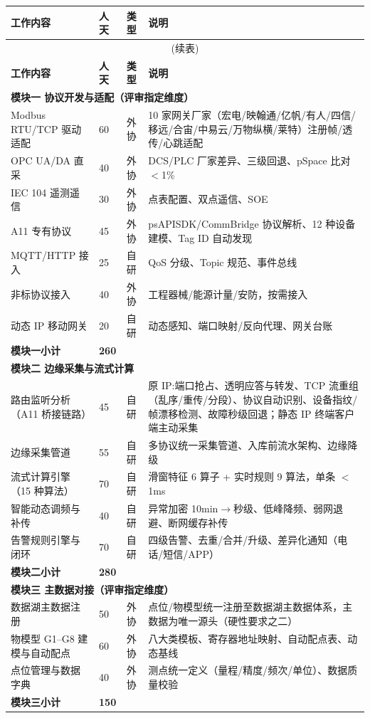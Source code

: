 \documentclass[11pt,a4paper]{ctexart}
\begin{document}
\begin{longtable}{p{4.6cm} p{1.8cm} p{1.5cm} p{4.2cm}}
\toprule
\textbf{工作内容} & \textbf{人天} & \textbf{类型} & \textbf{说明} \\
\midrule
\endfirsthead
\multicolumn{4}{c}{(续表)} \\
\toprule
\textbf{工作内容} & \textbf{人天} & \textbf{类型} & \textbf{说明} \\
\midrule
\endhead

\multicolumn{4}{l}{\textbf{模块一 协议开发与适配（评审指定维度）}} \\
Modbus RTU/TCP 驱动适配 & 60 & 外协 & 10 家网关厂家（宏电/映翰通/亿帆/有人/四信/移远/合宙/中易云/万物纵横/莱特）注册帧/透传/心跳适配 \\
OPC UA/DA 直采 & 40 & 外协 & DCS/PLC 厂家差异、三级回退、pSpace 比对 $<$1\% \\
IEC 104 遥测遥信 & 30 & 外协 & 点表配置、双点遥信、SOE \\
A11 专有协议 & 45 & 外协 & psAPISDK/CommBridge 协议解析、12 种设备建模、Tag ID 自动发现 \\
MQTT/HTTP 接入 & 25 & 自研 & QoS 分级、Topic 规范、事件总线 \\
非标协议接入 & 40 & 外协 & 工程器械/能源计量/安防，按需接入 \\
动态 IP 移动网关 & 20 & 自研 & 动态感知、端口映射/反向代理、网关台账 \\
\textbf{模块一小计} & \textbf{260} & & \\
\midrule

\multicolumn{4}{l}{\textbf{模块二 边缘采集与流式计算}} \\
路由监听分析（A11 桥接链路） & 45 & 自研 & 原 IP:端口抢占、透明应答与转发、TCP 流重组（乱序/重传/分段）、协议自动识别、设备指纹/帧漂移检测、故障秒级回退；静态 IP 终端客户端主动采集 \\
边缘采集管道 & 55 & 自研 & 多协议统一采集管道、入库前流水架构、边缘降级 \\
流式计算引擎（15 种算法） & 70 & 自研 & 滑窗特征 6 算子 + 实时规则 9 算法，单条 $<$1ms \\
智能动态调频与补传 & 40 & 自研 & 异常加密 10min$\rightarrow$秒级、低峰降频、弱网退避、断网缓存补传 \\
告警规则引擎与闭环 & 70 & 自研 & 四级告警、去重/合并/升级、差异化通知（电话/短信/APP） \\
\textbf{模块二小计} & \textbf{280} & & \\
\midrule

\multicolumn{4}{l}{\textbf{模块三 主数据对接（评审指定维度）}} \\
数据湖主数据注册 & 50 & 外协 & 点位/物模型统一注册至数据湖主数据体系，主数据为唯一源头（硬性要求之二） \\
物模型 G1--G8 建模与自动配点 & 60 & 外协 & 八大类模板、寄存器地址映射、自动配点表、动态基线 \\
点位管理与数据字典 & 40 & 外协 & 测点统一定义（量程/精度/频次/单位）、数据质量校验 \\
\textbf{模块三小计} & \textbf{150} & & \\
\midrule


\end{longtable}
\end{document}
